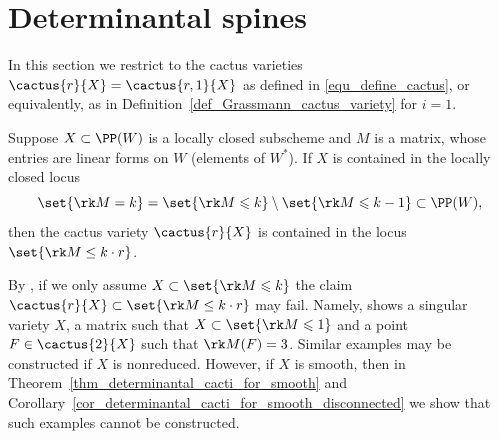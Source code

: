 \documentclass[12pt,a4paper]{article}
\begin{document}
\section{Determinantal spines}

In this section we restrict to the cactus varieties
$\cactus{r}{X}= \cactus{r,1}{X}$
  as defined in \eqref{equ_define_cactus}, or equivalently,
  as in Definition~\ref{def_Grassmann_cactus_variety} for $i=1$.


\begin{thm}\label{thm_determinantal_cacti}
   Suppose $X\subset \PP(W)$ is a locally closed subscheme and $M$ is a matrix, whose entries are linear forms on $W$ (elements of $W^*$).
   If $X$ is contained in the locally closed locus
   \[
    \set{\rk M = k} = \set{\rk M \leqslant k} \setminus \set{\rk M \leqslant k-1} \subset \PP (W),
   \]
   then the cactus variety $\cactus{r}{X}$ is contained in the locus $ \set{\rk M \le k \cdot r}$.
\end{thm}

By \cite[Rem.~7.5]{galazka_mgr_publ}, if we only assume $X \subset \set{\rk M \leqslant k}$ the claim $\cactus{r}{X} \subset \set{\rk M \le k \cdot r}$ may fail.
Namely, \cite[Ex.~7.4]{galazka_mgr_publ} shows a singular variety $X$, a matrix such that $X\subset \set{\rk M \leqslant 1}$
and a point $F\in \cactus{2}{X}$ such that $\rk M(F)=3$.
Similar examples may be constructed if $X$ is nonreduced.
However, if $X$ is smooth,
then in Theorem~\ref{thm_determinantal_cacti_for_smooth} and Corollary~\ref{cor_determinantal_cacti_for_smooth_disconnected}
we show that such examples cannot be constructed.
\end{document}
